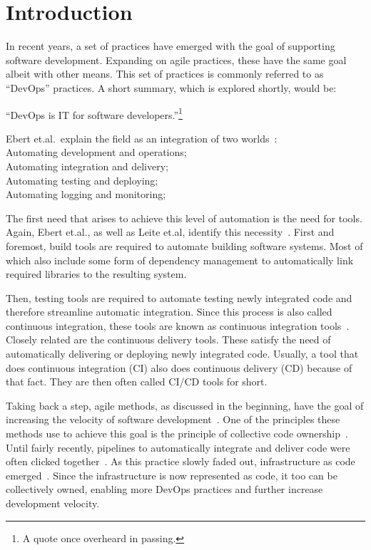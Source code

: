 \chapter{Introduction}
\label{ch:introduction}

In recent years, a set of practices have emerged with the goal of supporting software development.
Expanding on agile practices, these have the same goal albeit with other means.
This set of practices is commonly referred to as ``DevOps'' practices.
A short summary, which is explored shortly, would be:

``DevOps is IT for software developers.''\footnote{A quote once overheard in passing.}

Ebert et.al.\ explain the field as an integration of two worlds~\cite{DevOps}: \\
Automating development and operations; \\
Automating integration and delivery; \\
Automating testing and deploying; \\
Automating logging and monitoring;

The first need that arises to achieve this level of automation is the need for tools.
Again, Ebert et.al., as well as Leite et.al, identify this necessity~\cite{DevOps, ASurveyofDevOpsConceptsandChallenges}.
First and foremost, build tools are required to automate building software systems.
Most of which also include some form of dependency management to automatically link required libraries to the resulting system.

Then, testing tools are required to automate testing newly integrated code and therefore streamline automatic integration.
Since this process is also called continuous integration, these tools are known as continuous integration tools~\cite{DevOps}.
Closely related are the continuous delivery tools.
These satisfy the need of automatically delivering or deploying newly integrated code.
Usually, a tool that does continuous integration (CI) also does continuous delivery (CD) because of that fact.
They are then often called CI/CD tools for short.

\pagebreak

Taking back a step, agile methods, as discussed in the beginning, have the goal of increasing the velocity of software development~\cite{ADecadeOfAgileMethodologies}.
One of the principles these methods use to achieve this goal is the principle of collective code ownership~\cite{CommonAgilePracticesInSoftwareProcesses, ManagingCodeOwnership}.
Until fairly recently, pipelines to automatically integrate and deliver code were often clicked together~\cite{JenkinsClassicUi}.
As this practice slowly faded out, infrastructure as code emerged~\cite{ASystematicMappingStudyOfInfrastructureAsCodeResearch}.
Since the infrastructure is now represented as code, it too can be collectively owned, enabling more DevOps practices and further increase development velocity.


